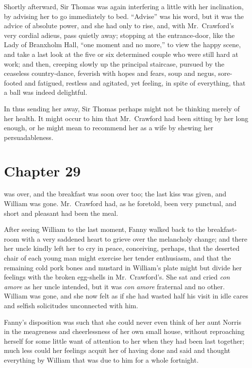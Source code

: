 Shortly afterward, Sir Thomas was again interfering
a little with her inclination, by advising her to go
immediately to bed.  ``Advise'' was his word, but it
was the advice of absolute power, and she had only
to rise, and, with Mr.\ Crawford's very cordial adieus,
pass quietly away; stopping at the entrance-door, like
the Lady of Branxholm Hall, ``one moment and no more,''
to view the happy scene, and take a last look at the five
or six determined couple who were still hard at work;
and then, creeping slowly up the principal staircase,
pursued by the ceaseless country-dance, feverish with hopes
and fears, soup and negus, sore-footed and fatigued,
restless and agitated, yet feeling, in spite of everything,
that a ball was indeed delightful.

In thus sending her away, Sir Thomas perhaps might not
be thinking merely of her health.  It might occur to him
that Mr.\ Crawford had been sitting by her long enough,
or he might mean to recommend her as a wife by shewing
her persuadableness.



\chapter{Chapter 29}

 was over, and the breakfast was soon over too;
the last kiss was given, and William was gone.
Mr.\ Crawford had, as he foretold, been very punctual,
and short and pleasant had been the meal.

After seeing William to the last moment, Fanny walked
back to the breakfast-room with a very saddened heart
to grieve over the melancholy change; and there her uncle
kindly left her to cry in peace, conceiving, perhaps,
that the deserted chair of each young man might exercise
her tender enthusiasm, and that the remaining cold pork
bones and mustard in William's plate might but divide
her feelings with the broken egg-shells in Mr.\ Crawford's.
She sat and cried \emph{con} \emph{amore} as her uncle intended,
but it was \emph{con} \emph{amore} fraternal and no other.
William was gone, and she now felt as if she had wasted
half his visit in idle cares and selfish solicitudes
unconnected with him.

Fanny's disposition was such that she could never even think
of her aunt Norris in the meagreness and cheerlessness
of her own small house, without reproaching herself
for some little want of attention to her when they had
been last together; much less could her feelings acquit
her of having done and said and thought everything
by William that was due to him for a whole fortnight.

